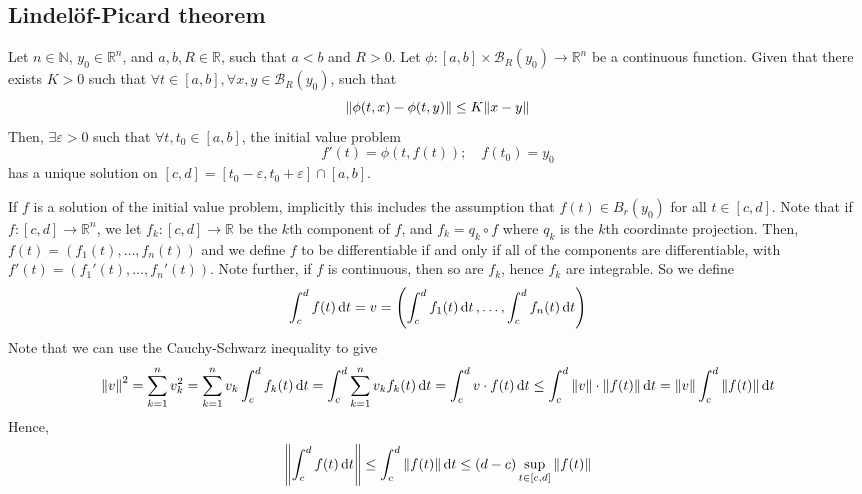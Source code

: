 \subsection{Lindel\"of-Picard theorem}
\begin{theorem}
	Let \( n \in \mathbb N \), \( y_0 \in \mathbb R^n \), and \( a,b,R \in \mathbb R \), such that \( a < b \) and \( R > 0 \).
	Let \( \phi \colon [a,b] \times \mathcal B_R(y_0) \to \mathbb R^n \) be a continuous function.
	Given that there exists \( K > 0 \) such that \( \forall t \in [a,b], \forall x,y \in \mathcal B_R(y_0) \), such that
	\[
		\norm{\phi(t,x) - \phi(t,y)} \leq K \norm{x-y}
	\]
	Then, \( \exists \varepsilon > 0 \) such that \( \forall t, t_0 \in [a,b] \), the initial value problem
	\[
		f'(t) = \phi(t, f(t));\quad f(t_0) = y_0
	\]
	has a unique solution on \( [c,d] = [t_0 - \varepsilon, t_0 + \varepsilon] \cap [a,b] \).
\end{theorem}
\begin{remark}
	If \( f \) is a solution of the initial value problem, implicitly this includes the assumption that \( f(t) \in B_r(y_0) \) for all \( t \in [c,d] \).
	Note that if \( f \colon [c,d] \to \mathbb R^n \), we let \( f_k \colon [c,d] \to \mathbb R \) be the \( k \)th component of \( f \), and \( f_k = q_k \circ f \) where \( q_k \) is the \( k \)th coordinate projection.
	Then, \( f(t) = (f_1(t), \dots, f_n(t)) \) and we define \( f \) to be differentiable if and only if all of the components are differentiable, with \( f'(t) = (f_1'(t), \dots, f_n'(t)) \).
	Note further, if \( f \) is continuous, then so are \( f_k \), hence \( f_k \) are integrable.
	So we define
	\[
		\int_c^d f(t) \dd{t} = v = \qty(\int_c^d f_1(t) \dd{t}, \dots, \int_c^d f_n(t) \dd{t})
	\]
	Note that we can use the Cauchy-Schwarz inequality to give
	\[
		\norm{v}^2 = \sum_{k=1}^n v_k^2 = \sum_{k=1}^n v_k \int_c^d f_k(t) \dd{t} = \int_c^d \sum_{k=1}^n v_k f_k(t) \dd{t} = \int_c^d v \cdot f(t) \dd{t} \leq \int_c^d \norm{v} \cdot \norm{f(t)} \dd{t} = \norm{v} \int_c^d \norm{f(t)} \dd{t}
	\]
	Hence,
	\[
		\norm{\int_c^d f(t) \dd{t}} \leq \int_c^d \norm{f(t)} \dd{t} \leq (d-c) \sup_{t \in [c,d]} \norm{f(t)}
	\]
\end{remark}
